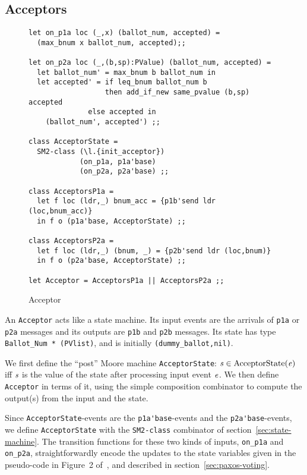 \documentclass[final]{article}
\newcommand{\dgclassrel}[3]{\NUPRLclassrel{}{#1}{}{#2}{#3}}
\newcommand{\listinline}[1]{\text{\lstinline{#1}}}
\begin{document}
\subsection{Acceptors}\label{sec:Paxos-acceptors}

\begin{figure}%
  \begin{lstlisting}[basicstyle=\small]
let on_p1a loc (_,x) (ballot_num, accepted) =
  (max_bnum x ballot_num, accepted);;

let on_p2a loc (_,(b,sp):PValue) (ballot_num, accepted) =
  let ballot_num' = max_bnum b ballot_num in
  let accepted' = if leq_bnum ballot_num b
     	          then add_if_new same_pvalue (b,sp) accepted
	       	  else accepted in
    (ballot_num', accepted') ;;

class AcceptorState =
  SM2-class (\l.{init_acceptor})
            (on_p1a, p1a'base)
            (on_p2a, p2a'base) ;;

class AcceptorsP1a =
  let f loc (ldr,_) bnum_acc = {p1b'send ldr (loc,bnum_acc)}
  in f o (p1a'base, AcceptorState) ;;

class AcceptorsP2a =
  let f loc (ldr,_) (bnum, _) = {p2b'send ldr (loc,bnum)}
  in f o (p2a'base, AcceptorState) ;;

let Acceptor = AcceptorsP1a || AcceptorsP2a ;;
  \end{lstlisting}
  \caption{Acceptor}
  \label{fig:Paxos-Acceptor}
\end{figure}

An \lstinline{Acceptor} acts like a state machine.  Its input events
are the arrivals of \lstinline{p1a} or \lstinline{p2a} messages
and its outputs are \lstinline{p1b} and \lstinline{p2b} messages.
Its state has type \lstinline{Ballot_Num * (PVlist)}, and is
initially \lstinline{(dummy_ballot,nil)}.

We first define the ``post'' Moore machine \lstinline{AcceptorState}:
$\dgclassrel{\NUPRLevent}{\listinline{AcceptorState}}{\NUPRL{s}}$ iff
$\mathit{s}$ is the value of the state after processing input event
$\mathit{e}$.  We then define \lstinline{Acceptor} in terms of it,
using the simple composition combinator to compute the output(s) from
the input and the state.

Since \lstinline{AcceptorState}-events are the
\lstinline{p1a'base}-events and the \lstinline{p2a'base}-events, we
define \lstinline{AcceptorState} with the \lstinline{SM2-class}
combinator of section~\ref{sec:state-machine}.  The transition
functions for these two kinds of inputs, \lstinline{on_p1a} and
\lstinline{on_p2a}, straightforwardly encode the updates to the state
variables given in the pseudo-code in Figure~2
of~\cite{VanRenesse:2011}, and described in
section~\ref{sec:paxos-voting}.
\end{document}
